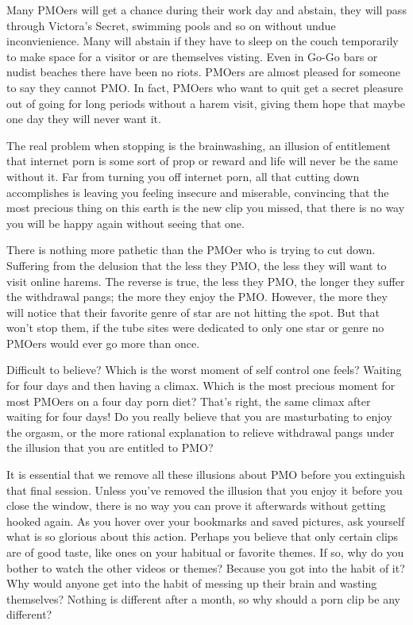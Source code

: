 \documentclass[easypeasy.tex]{subfiles}
\begin{document}
Many PMOers will get a chance during their work day and abstain, they will pass through Victora's Secret, swimming pools and so on without undue inconvienience. Many will abstain if they have to sleep on the couch temporarily to make space for a visitor or are themselves visting. Even in Go-Go bars or nudist beaches there have been no riots. PMOers are almost pleased for someone to say they cannot PMO. In fact, PMOers who want to quit get a secret pleasure out of going for long periods without a harem visit, giving them hope that maybe one day they will never want it.

The real problem when stopping is the brainwashing, an illusion of entitlement that internet porn is some sort of prop or reward and life will never be the same without it. Far from turning you off internet porn, all that cutting down accomplishes is leaving you feeling insecure and miserable, convincing that the most precious thing on this earth is the new clip you missed, that there is no way you will be happy again without seeing that one.

There is nothing more pathetic than the PMOer who is trying to cut down. Suffering from the delusion that the less they PMO, the less they will want to visit online harems. The reverse is true, the less they PMO, the longer they suffer the withdrawal pangs; the more they enjoy the PMO. However, the more they will notice that their favorite genre of star are not hitting the spot. But that won't stop them, if the tube sites were dedicated to only one star or genre no PMOers would ever go more than once.

Difficult to believe? Which is the worst moment of self control one feels? Waiting for four days and then having a climax. Which is the most precious moment for most PMOers on a four day porn diet? That's right, the same climax after waiting for four days! Do you really believe that you are masturbating to enjoy the orgasm, or the more rational explanation to relieve withdrawal pangs under the illusion that you are entitled to PMO?

It is essential that we remove all these illusions about PMO before you extinguish that final session. Unless you've removed the illusion that you enjoy it before you close the window, there is no way you can prove it afterwards without getting hooked again. As you hover over your bookmarks and saved pictures, ask yourself what is so glorious about this action. Perhaps you believe that only certain clips are of good taste, like ones on your habitual or favorite themes. If so, why do you bother to watch the other videos or themes? Because you got into the habit of it? Why would anyone get into the habit of messing up their brain and wasting themselves? Nothing is different after a month, so why should a porn clip be any different?
\end{document}
